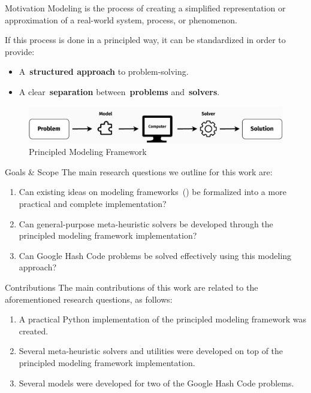 \begin{frame}{Motivation}
  \alert{Modeling} is the process of creating a simplified representation
  or approximation of a real-world system, process, or phenomenon.

  If this process is done in a principled way, it can be standardized in order to provide:
  \begin{itemize}
    \item A~\textbf{structured approach} to problem-solving.
    \item A clear~\textbf{separation} between~\textbf{problems} and~\textbf{solvers}.
  \end{itemize}

  \begin{figure}[h]
    \centering
    \includegraphics[width=\textwidth,keepaspectratio]{../assets/modelling/modelling-slides.pdf}
    \caption{Principled Modeling Framework}
  \end{figure}
\end{frame}

\begin{frame}{Goals \& Scope}
  The main research questions we outline for this work are:
  \begin{enumerate}
    \item Can existing ideas on modeling frameworks~(\cite{vieira2009uma,fonseca2021nasf4nio,outeiro2021application})
          be formalized into a more practical and complete implementation?

    \item Can general-purpose meta-heuristic solvers be developed
          through the principled modeling framework implementation?

    \item Can Google Hash Code problems be solved effectively using
          this modeling approach?
  \end{enumerate}
\end{frame}

\begin{frame}{Contributions}
  The main contributions of this work are related to the aforementioned research questions, as follows:
  \begin{enumerate}
    \item A practical Python implementation of the principled modeling framework was
          created.

    \item Several meta-heuristic solvers and utilities were developed on top of
          the principled modeling framework implementation.

    \item Several models were developed for two of the Google Hash Code problems.
  \end{enumerate}
\end{frame}

